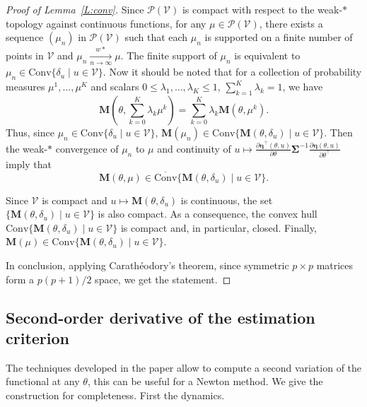 \documentclass[a4paper]{article}
\theoremstyle{definition}
\theoremstyle{remark}
\newcommand{\Conv}{\mathrm{Conv}}
\newcommand{\V}{\mathcal{V}}
\renewcommand{\P}{\mathcal{P}}
\newcommand{\Mb}{\mathbf{M}}
\newcommand{\etab}{\boldsymbol{\eta}}
\newcommand{\Sigmab}{\boldsymbol{\Sigma}}
\begin{document}
\begin{proof}[Proof of Lemma~\ref{L:conv}]
Since $\P(\V)$ is compact with respect to the weak-$*$ topology against continuous functions, for any $\mu\in \P(\V)$, there exists a sequence $(\mu_n)$ in $\P(\V)$ such that each $\mu_n$  is supported on a finite number of points in $\V$ and $\mu_n\xrightarrow[n\to\infty]{w*}\mu$. The finite support of  $\mu_n$ is equivalent to $\mu_n\in \Conv \{\delta_u\mid u\in \V\}$. Now it should be noted that for a collection  of probability measures $\mu^1,\dots, \mu^K$ and scalars $0\leq \lambda_1,\dots ,\lambda_K\leq 1$, $\sum_{k=1}^K\lambda_k=1$, we have 
$$
\Mb\left(\theta,\sum_{k=0}^K \lambda_k\mu^k\right)=\sum_{k=0}^K \lambda_k \Mb\left(\theta,\mu^k\right).
$$
Thus, since $\mu_n\in \Conv \{\delta_u\mid u\in \V\}$, $\Mb(\mu_n)\in\Conv \{\Mb(\theta,\delta_u)\mid u\in \V\}$. Then the weak-$*$ convergence of $\mu_n$ to $\mu$ and continuity of $u\mapsto \frac{\partial\etab^\top(\theta,u)}{\partial\theta}
\Sigmab^{-1} \frac{\partial\etab(\theta,u)}{\partial\theta^\top}$ imply that 
$$
\Mb(\theta,\mu)\in \overline{\Conv}\{\Mb(\theta,\delta_u)\mid u\in \V\}.
$$ 

Since $\V$ is compact and $u\mapsto \Mb(\theta,\delta_u)$ is continuous, the set  $\{\Mb(\theta,\delta_u)\mid u\in \V\}$ is also compact. As a consequence, the convex hull $\Conv \{\Mb(\theta,\delta_u)\mid u\in \V\}$ is compact and, in particular, closed. Finally, $\Mb(\mu)\in \Conv\{\Mb(\theta,\delta_u)\mid u\in \V\}$.

In conclusion, applying Carathéodory's theorem, since symmetric $p\times p$ matrices form a $p(p+1)/2$ space, we get the statement.
\end{proof}




\subsection{Second-order derivative of the estimation criterion}
The techniques developed in the paper allow to compute a second variation of the functional at any $\theta$, this can be useful for a Newton method. We give the construction for completeness. First the dynamics.
\end{document}
